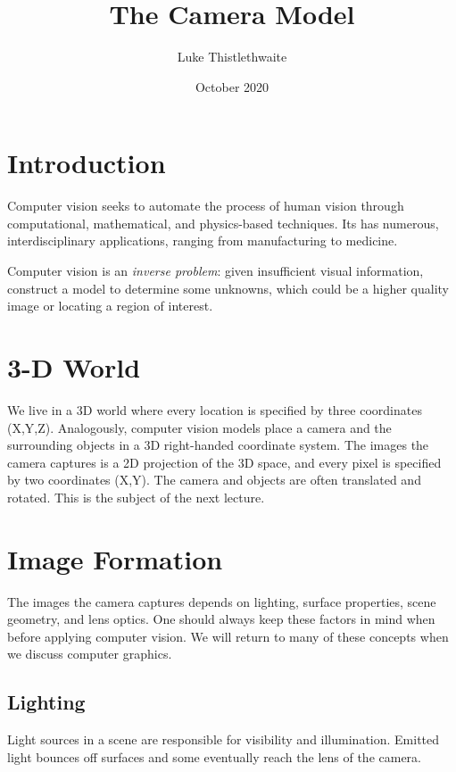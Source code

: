 \documentclass{article}
\title{The Camera Model}
\author{ Luke Thistlethwaite }
\date{October 2020}
\begin{document}
\maketitle

\section{Introduction}
Computer vision seeks to automate the process of human vision through computational, mathematical, and physics-based techniques. Its has numerous, interdisciplinary applications, ranging from manufacturing to medicine.

Computer vision is an \textit{inverse problem}: given insufficient visual information, construct a model to determine some unknowns, which could be a higher quality image or locating a region of interest.


\section{3-D World}
We live in a 3D world where every location is specified by three coordinates (X,Y,Z). Analogously, computer vision models place a camera and the surrounding objects in a 3D right-handed coordinate system. The images the camera captures is a 2D projection of the 3D space, and every pixel is specified by two coordinates (X,Y). The camera and objects are often translated and rotated. This is the subject of the next lecture.  

\section{Image Formation}
The images the camera captures depends on lighting, surface properties, scene geometry, and lens optics. One should always keep these factors in mind when before applying computer vision. We will return to many of these concepts when we discuss computer graphics. 

\subsection{Lighting}
Light sources in a scene are responsible for visibility and illumination. Emitted light bounces off surfaces and some eventually reach the lens of the camera.
\end{document}
